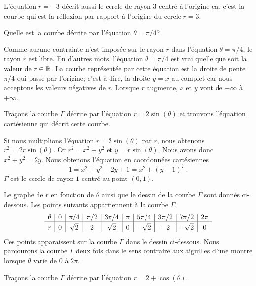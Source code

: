 {\begin{egg}
L'équation $r=-3$ décrit aussi le cercle de rayon $3$ centré à
l'origine car c'est la courbe qui est la réflexion par rapport à
l'origine du cercle $r=3$.
\end{egg}

\begin{egg}
Quelle est la courbe décrite par l'équation $\theta = \pi/4$?

Comme aucune contrainte n'est imposée sur le rayon $r$ dans l'équation
$\theta = \pi/4$, le rayon $r$ est libre.  En d'autres mots,
l'équation $\theta = \pi/4$ est vrai quelle que soit la valeur de
$r \in \mathbb{R}$.  La courbe représentée par cette équation est la droite
de pente $\pi/4$ qui passe par l'origine;  c'est-à-dire, la droite
$y=x$ au complet car nous acceptons les valeurs négatives de $r$. Lorsque
$r$ augmente, $x$ et $y$ vont de $-\infty$ à $+\infty$.
\end{egg}

\begin{egg}
Traçons la courbe $\Gamma$ décrite par l'équation $r = 2\sin(\theta)$
et trouvons l'équation cartésienne qui décrit cette courbe.

Si nous multiplions l'équation $r=2\sin(\theta)$ par $r$, nous obtenons
$r^2= 2 r \sin(\theta)$.  Or $r^2 = x^2 + y^2$ et $y = r\sin(\theta)$.
Nous avons donc $x^2+y^2 = 2y$.  Nous obtenons l'équation en coordonnées
cartésiennes
\[
1 = x^2+y^2 -2y + 1 = x^2 + (y-1)^2 \; .
\]
$\Gamma$ est le cercle de rayon $1$ centré au point $(0,1)$.

Le graphe de $r$ en fonction de $\theta$ ainsi que le dessin de la
courbe $\Gamma$ sont donnés ci-dessous.  Les points suivants
appartiennent à la courbe $\Gamma$.
\[
\begin{array}{*{9}{c|}c}
\theta & 0 & \pi/4 & \pi/2 & 3\pi/4 & \pi & 5\pi/4 & 3\pi/2 & 7\pi/2 &
2\pi \\
\hline
\rule{0pt}{1.1em} r & 0 & \sqrt{2} & 2 & \sqrt{2} & 0 & -\sqrt{2} & -2 &
-\sqrt{2} & 0
\end{array}
\]
Ces points apparaissent sur la courbe $\Gamma$ dans le dessin
ci-dessous.  Nous parcourons la courbe $\Gamma$ deux fois dans le
sens contraire aux aiguilles d'une montre lorsque $\theta$ varie de
$0$ à $2\pi$.
\label{eggPOLAR2}
\end{egg}

\begin{egg}
Traçons la courbe $\Gamma$ décrite par l'équation $r = 2 + \cos(\theta)$.


\end{egg}}
